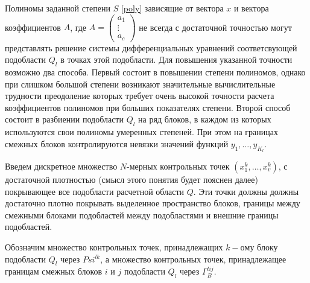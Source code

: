 \documentclass[a4paper,12pt]{article}
\begin{document}
Полиномы заданной степени $S$ \eqref{poly} зависящие от вектора $x$ и 
вектора коэффициентов $A$, где
$A=\left(\begin{matrix}a_1\\\vdots\\ a_c\end{matrix}\right)$
не всегда с достаточной точностью могут представлять решение системы 
дифференциальных уравнений соответсвующей подобласти $Q_l$ в точках
этой подобласти. Для повышения указанной точности возможно два способа.
Первый состоит в повышении степени полиномов, однако при слишком 
большой степени возникают значительные вычислительные трудности
преодоление которых требует очень высокой точности расчета
коэффициентов полиномов при больших показателях степени. Второй способ
состоит в разбиении подобласти $Q_l$ на ряд блоков, в каждом из которых
используются свои полиномы умеренных степеней. При этом на границах
смежных блоков контролируются невязки значений функций
$y_1,\ldots,y_{K_l}$.

Введем дискретное множество $N$-мерных контрольных точек
$(x^k_1,\ldots,x^k_v)$, с достаточной плотностью (смысл этого понятия 
будет пояснен далее) покрывающее все подобласти расчетной области $Q$. 
Эти точки должны должны достаточно плотно покрывать выделенное пространство
блоков, границы между смежными блоками подобластей между подобластями и
внешние границы подобластей. 

Обозначим множество контрольных точек, принадлежащих $k-ому$ блоку 
подобласти $Q_l$ через $Psi^{lk}$, а множество контрольных точек,
принадлежащее границам смежных блоков $i$ и $j$ подобласти $Q_l$ через
$\Gamma^{lij}_B$.
\end{document}
